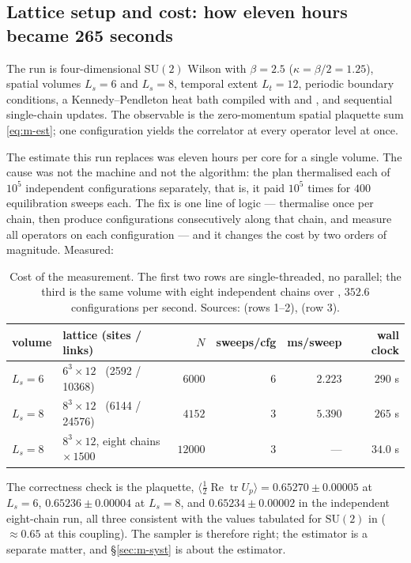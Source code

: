 \subsection{Lattice setup and cost: how eleven hours became 265 seconds}
\label{sec:m-setup}

The run is four-dimensional $\mathrm{SU}(2)$ Wilson with $\beta=2.5$ ($\kappa=\beta/2=1.25$), spatial
volumes $L_s=6$ and $L_s=8$, temporal extent $L_t=12$, periodic boundary conditions, a
Kennedy--Pendleton heat bath compiled with  and , and sequential
single-chain updates. The observable is the zero-momentum spatial plaquette sum \eqref{eq:m-est};
one configuration yields the correlator at every operator level at once.

The estimate this run replaces was eleven hours per core for a single volume. The cause was not the
machine and not the algorithm: the plan thermalised each of $10^{5}$ independent configurations
separately, that is, it paid $10^{5}$ times for $400$ equilibration sweeps each. The fix is one line
of logic --- thermalise once per chain, then produce configurations consecutively along that chain,
and measure all operators on each configuration --- and it changes the cost by two orders of
magnitude. Measured:

\begin{table}[htbp]
\centering\small
\begin{tabular}{@{}llrrrr@{}}
\toprule
volume & lattice (sites / links) & $N$ & sweeps/cfg & ms/sweep & wall clock \\
\midrule
$L_s=6$  & $6^3\times12$ \ (2592 / 10368) & $6000$  & $6$ & $2.223$ & $290$ s \\
$L_s=8$  & $8^3\times12$ \ (6144 / 24576) & $4152$  & $3$ & $5.390$ & $265$ s \\
$L_s=8$  & $8^3\times12$, eight chains $\times\,1500$ & $12000$ & $3$ & --- & $34.0$ s \\
\bottomrule
\end{tabular}
\caption{Cost of the measurement. The first two rows are single-threaded, no parallel; the third is
the same volume with eight independent chains over , $352.6$ configurations per second.
Sources:  (rows 1--2),  (row 3).}
\label{tab:m-cost}
\end{table}

The correctness check is the plaquette,
$\langle\tfrac12\operatorname{Re}\operatorname{tr}U_p\rangle=0.65270\pm0.00005$ at $L_s=6$,
$0.65236\pm0.00004$ at $L_s=8$, and $0.65234\pm0.00002$ in the independent eight-chain run, all
three consistent with the values tabulated for $\mathrm{SU}(2)$ in \cite{creutz} ($\approx0.65$ at
this coupling). The sampler is therefore
right; the estimator is a separate matter, and \S\ref{sec:m-syst} is about the estimator.


